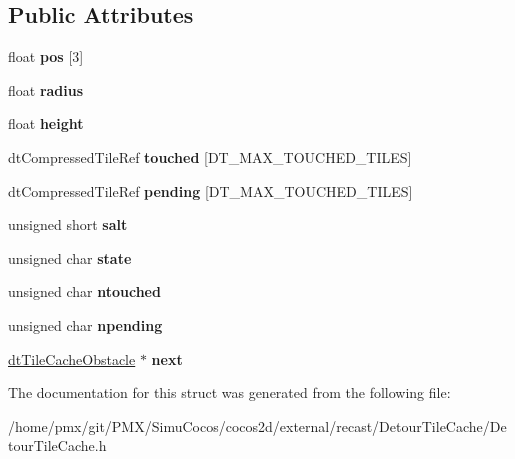 \subsection*{Public Attributes}
\begin{DoxyCompactItemize}
\item 
\mbox{\label{structdtTileCacheObstacle_aeaba1c4d844aa09df333f7db7be0d1c1}} 
float {\bfseries pos} \mbox{[}3\mbox{]}
\item 
\mbox{\label{structdtTileCacheObstacle_a4cb1a4e9fd11b63394789b0aa84fd7bd}} 
float {\bfseries radius}
\item 
\mbox{\label{structdtTileCacheObstacle_ab2fd09ed34a60930fe8d65cefcc2409a}} 
float {\bfseries height}
\item 
\mbox{\label{structdtTileCacheObstacle_a83773f6354d1b40714445c6a7eb1e2e2}} 
dt\+Compressed\+Tile\+Ref {\bfseries touched} \mbox{[}D\+T\+\_\+\+M\+A\+X\+\_\+\+T\+O\+U\+C\+H\+E\+D\+\_\+\+T\+I\+L\+ES\mbox{]}
\item 
\mbox{\label{structdtTileCacheObstacle_a2ec822a30872e2284cdf2a4c68b57231}} 
dt\+Compressed\+Tile\+Ref {\bfseries pending} \mbox{[}D\+T\+\_\+\+M\+A\+X\+\_\+\+T\+O\+U\+C\+H\+E\+D\+\_\+\+T\+I\+L\+ES\mbox{]}
\item 
\mbox{\label{structdtTileCacheObstacle_aaed7d123d0feb3efcfa735968c478fe3}} 
unsigned short {\bfseries salt}
\item 
\mbox{\label{structdtTileCacheObstacle_a43d1c2aa32d48a2a88713ca3f62e0512}} 
unsigned char {\bfseries state}
\item 
\mbox{\label{structdtTileCacheObstacle_a10ae8b8922bd1cad14693de0c69c27c3}} 
unsigned char {\bfseries ntouched}
\item 
\mbox{\label{structdtTileCacheObstacle_a49a8cbfab1e19c6d5aa378f1a33f02ec}} 
unsigned char {\bfseries npending}
\item 
\mbox{\label{structdtTileCacheObstacle_ae5c511c57e50983973e976c8b715dc69}} 
\hyperlink{structdtTileCacheObstacle}{dt\+Tile\+Cache\+Obstacle} $\ast$ {\bfseries next}
\end{DoxyCompactItemize}


The documentation for this struct was generated from the following file\+:\begin{DoxyCompactItemize}
\item 
/home/pmx/git/\+P\+M\+X/\+Simu\+Cocos/cocos2d/external/recast/\+Detour\+Tile\+Cache/Detour\+Tile\+Cache.\+h\end{DoxyCompactItemize}

